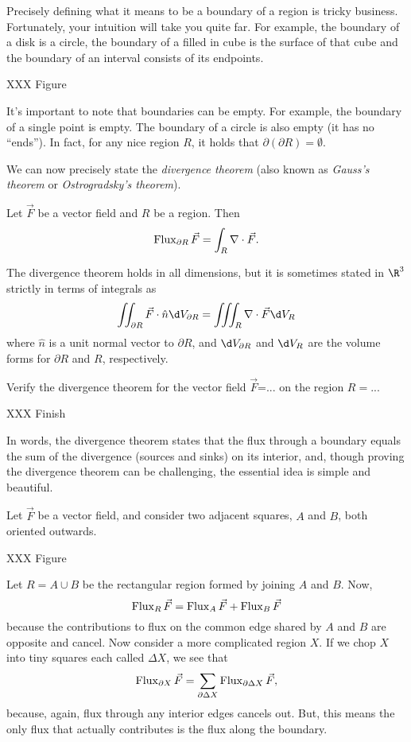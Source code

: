 Precisely defining what it means to be a boundary
of a region is tricky business.  Fortunately, your intuition will take you quite far.
For example, the boundary of a disk is a circle, the boundary of a filled in cube
is the surface of that cube and the boundary of an interval consists of its endpoints.

XXX Figure

It's important to note that boundaries can be empty.  For example, the boundary
of a single point is empty.  The boundary of a circle is also empty (it has no ``ends'').
In fact, for any nice region $R$, it holds that $\partial (\partial R) = \emptyset$.


We can now precisely state the \emph{divergence theorem}
(also known as \emph{Gauss's theorem} or 
\emph{Ostrogradsky's theorem}).

\begin{theorem}
	Let $\vec F$ be a vector field and $R$ be a region.  Then
	\[
		\operatorname{Flux}_{\partial R} \vec F = \int_{R} \nabla \cdot \vec F.
	\]
\end{theorem}

The divergence theorem holds in all dimensions, but it is sometimes
stated in $\R^3$ strictly in terms of integrals as
\[
	\iint_{\partial R} \vec F\cdot \hat n \d V_{\partial R}
	=\iiint_R \nabla \cdot \vec F \d V_{R}
\]
where $\hat n$ is a unit normal vector to $\partial R$, and $\d V_{\partial R}$
and $\d V_R$ are the volume forms for $\partial R$ and $R$, respectively.

\begin{example}
	Verify the divergence theorem for the vector field $\vec F$=...
	on the region $R=...$

	XXX Finish
\end{example}

\bigskip
In words, the divergence theorem states that the flux through a
boundary equals the sum of the divergence (sources and sinks)
on its interior, and, though proving the divergence theorem can be challenging,
the essential idea is simple and beautiful.

Let $\vec F$ be a vector field, and 
consider two adjacent squares, $A$ and $B$, both oriented outwards.

XXX Figure

Let $R=A\cup B$ be the rectangular region formed by joining $A$ and $B$.  Now,
\[
	\operatorname{Flux}_R \vec F = \operatorname{Flux}_A\vec F+\operatorname{Flux}_B \vec F
\]
because the contributions to flux on the common edge shared by $A$ and $B$
are opposite and cancel.  Now consider a more complicated region $X$.  If
we chop $X$ into tiny squares each called $\Delta X$, we see that
\[
	\operatorname{Flux}_{\partial X} \vec F = \sum_{\partial \Delta X} \operatorname{Flux}_{\partial \Delta X} \vec F,
\]
because, again, flux through any interior edges cancels out.  But, this means
the only flux that actually contributes is the flux along the boundary.

